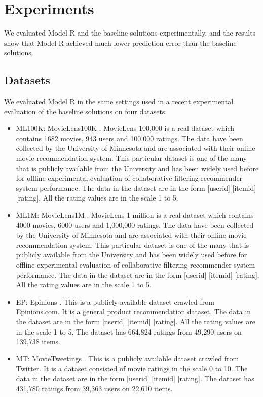 \documentclass[12pt]{WSUThesis}
\theoremstyle{definition}
\begin{document}
\section{Experiments}
We evaluated Model R and the baseline solutions experimentally,
and the results show that Model R achieved much lower prediction error than 
the baseline solutions.

\subsection{Datasets}
We evaluated Model R in the same settings used in a recent experimental 
evaluation of the baseline solutions \cite{polatidis2016multi} on four datasets:
\begin{itemize}
	\item ML100K: MovieLens100K \cite{harper2015movielens}. MovieLens 100,000 is a real dataset which contains 1682 movies, 943 users and 100,000 ratings. The data have been collected by the University of Minnesota and are associated with their online movie recommendation system. This particular dataset is one of the many that is publicly available from the University and has been widely used before for offline experimental evaluation of collaborative filtering recommender system performance. The data in the dataset are in the form [userid] [itemid] [rating]. All the rating values are in the scale 1 to 5.
	\item ML1M: MovieLens1M \cite{harper2015movielens}. MovieLens 1 million is a real dataset which contains 4000 movies, 6000 users and 1,000,000 ratings. The data have been collected by the University of Minnesota and are associated with their online movie recommendation system. This particular dataset is one of the many that is publicly available from the University and has been widely used before for offline experimental evaluation of collaborative filtering recommender system performance. The data in the dataset are in the form [userid] [itemid] [rating]. All the rating values are in the scale 1 to 5.
	\item EP: Epinions \cite{massa2007trust}. This is a publicly available dataset crawled from Epinions.com. It is a general product recommendation dataset. The data in the dataset are in the form [userid] [itemid] [rating]. All the rating values are in the scale 1 to 5. The dataset has 664,824 ratings from 49,290 users on 139,738 items.
	\item MT: MovieTweetings \cite{dooms2013movietweetings}. This is a publicly available dataset crawled from Twitter. It is a dataset consisted of movie ratings in the scale 0 to 10. The data in the dataset are in the form [userid] [itemid] [rating]. The dataset has 431,780 ratings from 39,363 users on 22,610 items.
\end{itemize}
\end{document}
